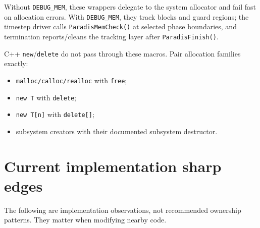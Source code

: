\documentclass[11pt]{article}
\newcommand{\code}[1]{\texorpdfstring{\nolinkurl{#1}}{#1}}
\begin{document}


Without \code{DEBUG_MEM}, these wrappers delegate to the system allocator and
fail fast on allocation errors.  With \code{DEBUG_MEM}, they track blocks and
guard regions; the timestep driver calls \code{ParadisMemCheck()} at selected
phase boundaries, and termination reports/cleans the tracking layer after
\code{ParadisFinish()}.

C++ \code{new}/\code{delete} do not pass through these macros.  Pair
allocation families exactly:

\begin{itemize}
\item \code{malloc/calloc/realloc} with \code{free};
\item \code{new T} with \code{delete};
\item \code{new T[n]} with \code{delete[]};
\item subsystem creators with their documented subsystem destructor.
\end{itemize}

\section{Current implementation sharp edges}

The following are implementation observations, not recommended ownership
patterns.  They matter when modifying nearby code.
\end{document}
